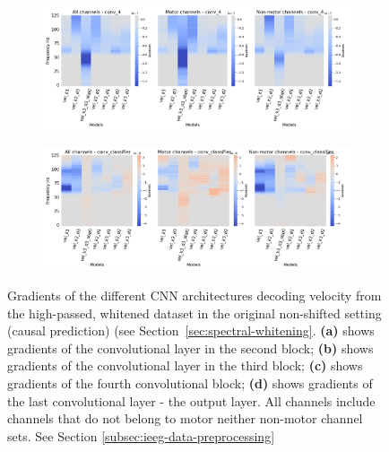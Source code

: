 \begin{figure}[!htbp]\ContinuedFloat

\begin{subfigure}[b]{\textwidth}
   \includegraphics[width=1\linewidth]{img/appendix/D/conv-4/hp-m/vel_model_gradients_all_kinds}
   \caption{}
   \label{fig:vel-pw-hp-grads-conv-4}
\end{subfigure}


\begin{subfigure}[b]{\textwidth}
   \includegraphics[width=1\linewidth]{img/appendix/D/conv-classifier/hp-m/vel_model_gradients_all_kinds}
   \caption{}
   \label{fig:vel-pw-hp-grads-conv-classifier}
\end{subfigure}

\caption[]{Gradients of the different CNN architectures decoding velocity from the high-passed, whitened dataset in the original non-shifted setting (causal prediction) (see Section~\ref{sec:spectral-whitening}. \textbf{(a)} shows gradients of the convolutional layer in the second block; \textbf{(b)} shows gradients of the convolutional layer in the third block; \textbf{(c)} shows gradients of the fourth convolutional block; \textbf{(d)} shows gradients of the last convolutional layer - the output layer. All channels include channels that do not belong to motor neither non-motor channel sets. See Section \ref{subsec:ieeg-data-preprocessing}}
\label{fig:vel-pw-hp-grads}
\end{figure}

